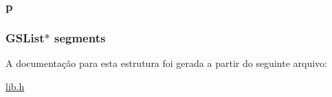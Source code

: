\subsubsection[{\texorpdfstring{p}{p}}]{ p}\hypertarget{structdbVertice_a03ab875eb2041f01ba2b5b86d413896b}{}\label{structdbVertice_a03ab875eb2041f01ba2b5b86d413896b}
\subsubsection[{\texorpdfstring{segments}{segments}}]{\setlength{\rightskip}{0pt plus 5cm}G\+S\+List$\ast$ segments}\hypertarget{structdbVertice_a0ae9e8feccea4307d768c5c1463f4d28}{}\label{structdbVertice_a0ae9e8feccea4307d768c5c1463f4d28}


A documentação para esta estrutura foi gerada a partir do seguinte arquivo\+:\begin{DoxyCompactItemize}
\item 
\hyperlink{lib_8h}{lib.\+h}\end{DoxyCompactItemize}
